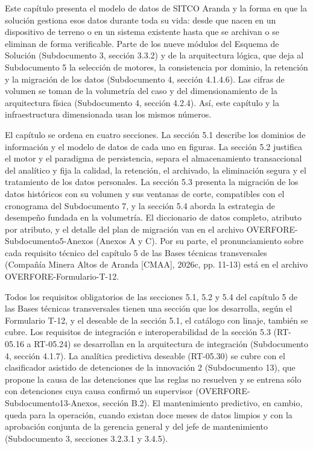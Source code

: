 \documentclass[subdoc]{../../comun/overfore}
\begin{document}
Este capítulo presenta el modelo de datos de SITCO Aranda y la forma en que la solución gestiona esos datos durante toda su vida: desde que nacen en un dispositivo de terreno o en un sistema existente hasta que se archivan o se eliminan de forma verificable. Parte de los nueve módulos del Esquema de Solución (Subdocumento 3, sección 3.3.2) y de la arquitectura lógica, que deja al Subdocumento 5 la selección de motores, la consistencia por dominio, la retención y la migración de los datos (Subdocumento 4, sección 4.1.4.6). Las cifras de volumen se toman de la volumetría del caso y del dimensionamiento de la arquitectura física (Subdocumento 4, sección 4.2.4). Así, este capítulo y la infraestructura dimensionada usan los mismos números.

El capítulo se ordena en cuatro secciones. La sección 5.1 describe los dominios de información y el modelo de datos de cada uno en figuras. La sección 5.2 justifica el motor y el paradigma de persistencia, separa el almacenamiento transaccional del analítico y fija la calidad, la retención, el archivado, la eliminación segura y el tratamiento de los datos personales. La sección 5.3 presenta la migración de los datos históricos con su volumen y sus ventanas de corte, compatibles con el cronograma del Subdocumento 7, y la sección 5.4 aborda la estrategia de desempeño fundada en la volumetría. El diccionario de datos completo, atributo por atributo, y el detalle del plan de migración van en el archivo OVERFORE-Subdocumento5-Anexos (Anexos A y C). Por su parte, el pronunciamiento sobre cada requisito técnico del capítulo 5 de las Bases técnicas transversales (Compañía Minera Altos de Aranda [CMAA], 2026c, pp. 11-13) está en el archivo OVERFORE-Formulario-T-12.

Todos los requisitos obligatorios de las secciones 5.1, 5.2 y 5.4 del capítulo 5 de las Bases técnicas transversales tienen una sección que los desarrolla, según el Formulario T-12, y el deseable de la sección 5.1, el catálogo con linaje, también se cubre. Los requisitos de integración e interoperabilidad de la sección 5.3 (RT-05.16 a RT-05.24) se desarrollan en la arquitectura de integración (Subdocumento 4, sección 4.1.7). La analítica predictiva deseable (RT-05.30) se cubre con el clasificador asistido de detenciones de la innovación 2 (Subdocumento 13), que propone la causa de las detenciones que las reglas no resuelven y se entrena sólo con detenciones cuya causa confirmó un supervisor (OVERFORE-Subdocumento13-Anexos, sección B.2). El mantenimiento predictivo, en cambio, queda para la operación, cuando existan doce meses de datos limpios y con la aprobación conjunta de la gerencia general y del jefe de mantenimiento (Subdocumento 3, secciones 3.2.3.1 y 3.4.5).
\end{document}
